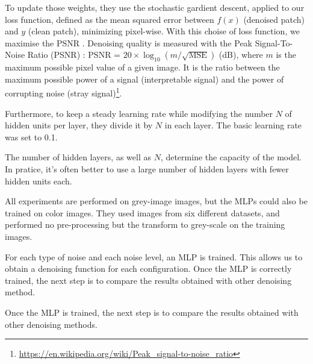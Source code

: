 \documentclass[10pt,a4paper]{article}
\newcommand{\svs}{\vspace{9pt}}
\begin{document}
\svs

To update those weights, they use the stochastic gardient descent, applied to our loss function, defined as the mean squared error between $f(x)$ (denoised patch) and $y$ (clean patch), minimizing pixel-wise. With this choise of loss function, we maximise the PSNR . %
Denoising quality is measured with the Peak Signal-To-Noise Ratio (PSNR) : PSNR = $20 \times \log_{10}(m/\sqrt{\mathrm{MSE}})$ (dB), where $m$ is the maximum possible pixel value of a given image. It is the ratio between the maximum possible power of a signal (interpretable signal) and the power of corrupting noise (stray signal)\footnote{\href{https://en.wikipedia.org/wiki/Peak\_signal-to-noise\_ratio}{https://en.wikipedia.org/wiki/Peak\_signal-to-noise\_ratio}}.

\svs

Furthermore, to keep a steady learning rate while modifying the number $N$ of hidden units per layer, they divide it by $N$ in each layer. The basic learning rate was set to 0.1. 

\svs

The number of hidden layers, as well as $N$, determine the capacity of the model. In pratice, it's often better to use a large number of hidden layers with fewer hidden units each.

\svs

All experiments are performed on grey-image images, but the MLPs could also be trained on color images. They used images from six different datasets, and performed no pre-processing but the transform to grey-scale on the training images. 

\svs 

For each type of noise and each noise level, an MLP is trained. This allows us to obtain a
denoising function for each configuration.
Once the MLP is correctly trained, the next step is to compare the results obtained with other
denoising method.

Once the MLP is trained, the next step is to compare the results obtained with other denoising methods.


\end{document}
